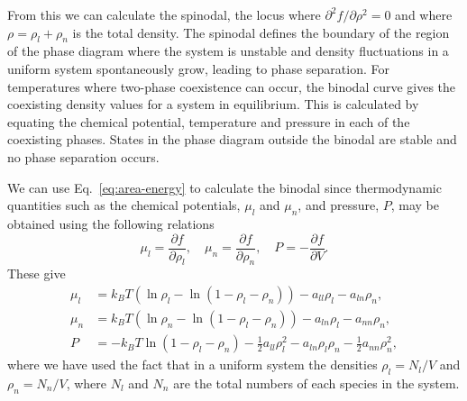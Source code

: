 \documentclass[journal=langd5,manuscript=article]{achemso}
\begin{document}
From this we can calculate the spinodal, the locus
where $\partial^2f/\partial\rho^2 = 0$ and where
$\rho = \rho_l + \rho_n$ is the total density. The spinodal defines the
boundary of the region of the phase diagram where
the system is unstable and density fluctuations in a uniform system
spontaneously grow, leading to phase separation.
For temperatures where two-phase coexistence can occur, the binodal
curve gives the coexisting density values for a system in equilibrium.
This is calculated by equating the chemical potential, temperature and
pressure in each of the coexisting phases. States in the phase diagram
outside the binodal are stable and no phase separation occurs.

We can use Eq.~\eqref{eq:area-energy} to calculate the binodal since
thermodynamic quantities such as the chemical potentials, $\mu_l$ and
$\mu_n$, and pressure, $P$, may be obtained using the following relations
%
\begin{equation}
  \mu_l = \frac{\partial f}{\partial \rho_l},
  \quad \mu_n = \frac{\partial f}{\partial \rho_n},
  \quad P = -\frac{\partial f}{\partial V}.
\end{equation}
%
These give
%
\begin{align}
  \mu_l &= k_BT (\ln \rho_l - \ln(1 - \rho_l - \rho_n))
         - a_{ll} \rho_l
         - a_{ln} \rho_n,
\\
  \mu_n &= k_BT (\ln \rho_n - \ln(1 - \rho_l - \rho_n))
         - a_{ln} \rho_l
         - a_{nn} \rho_n,
\\
  P  &= -k_BT \ln(1 - \rho_l - \rho_n)
       - \frac12 a_{ll} \rho_l^2
       - a_{ln} \rho_l \rho_n
       - \frac12 a_{nn} \rho_n^2,
\label{eq:quantities}
\end{align}
where we have used the fact that in a uniform system the densities
$\rho_l = N_l/V$ and $\rho_n = N_n/V$, where $N_l$ and $N_n$ are the
total numbers of each species in the system.
\end{document}
